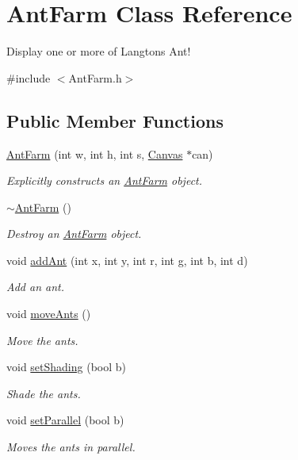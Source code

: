 \hypertarget{class_ant_farm}{}\section{Ant\+Farm Class Reference}
\label{class_ant_farm}


Display one or more of Langton\textquotesingle{}s Ant!  




{\ttfamily \#include $<$Ant\+Farm.\+h$>$}

\subsection*{Public Member Functions}
\begin{DoxyCompactItemize}
\item 
\hyperlink{class_ant_farm_af788cadd7ccb425440294af033fc6159}{Ant\+Farm} (int w, int h, int s, \hyperlink{classtsgl_1_1_canvas}{Canvas} $\ast$can)
\begin{DoxyCompactList}\small\item\em Explicitly constructs an \hyperlink{class_ant_farm}{Ant\+Farm} object. \end{DoxyCompactList}\item 
\hyperlink{class_ant_farm_a0b4fee39eeac74f6d866344a5cf221c4}{$\sim$\+Ant\+Farm} ()
\begin{DoxyCompactList}\small\item\em Destroy an \hyperlink{class_ant_farm}{Ant\+Farm} object. \end{DoxyCompactList}\item 
void \hyperlink{class_ant_farm_a30370a9e93b1534806ce47905359cf86}{add\+Ant} (int x, int y, int r, int g, int b, int d)
\begin{DoxyCompactList}\small\item\em Add an ant. \end{DoxyCompactList}\item 
void \hyperlink{class_ant_farm_a083c7d1e148cf6f36c2378795b239290}{move\+Ants} ()
\begin{DoxyCompactList}\small\item\em Move the ants. \end{DoxyCompactList}\item 
void \hyperlink{class_ant_farm_a5b333a275f2e0ff8700932fdfa04df08}{set\+Shading} (bool b)
\begin{DoxyCompactList}\small\item\em Shade the ants. \end{DoxyCompactList}\item 
void \hyperlink{class_ant_farm_ad4d22511ce20db2dedc7d61d4ca42e66}{set\+Parallel} (bool b)
\begin{DoxyCompactList}\small\item\em Moves the ants in parallel. \end{DoxyCompactList}\end{DoxyCompactItemize}
